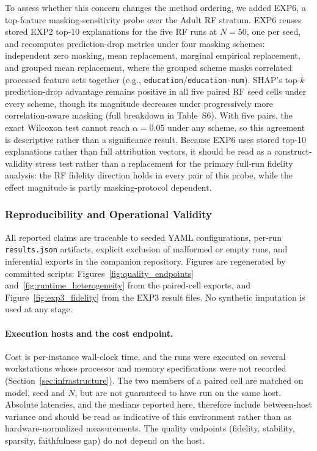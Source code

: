 \documentclass[10pt,a4paper,twoside]{article}
\begin{document}
To assess whether this concern changes the method ordering, we added EXP6,
a top-feature masking-sensitivity probe over the Adult RF stratum. EXP6
reuses stored EXP2 top-10 explanations for the five RF runs at $N=50$,
one per seed, and recomputes prediction-drop metrics under four masking schemes:
independent zero masking, mean replacement, marginal empirical replacement,
and grouped mean replacement, where the grouped scheme masks correlated
processed feature sets together (e.g.,
\texttt{education}/\texttt{education-num}). SHAP's top-$k$ prediction-drop
advantage remains positive in all five paired RF seed cells under every
scheme, though its magnitude decreases under progressively more
correlation-aware masking (full breakdown in Table~S6). With five pairs, the exact Wilcoxon test cannot reach
$\alpha = 0.05$ under any scheme, so this agreement is descriptive rather
than a significance result. Because EXP6 uses stored top-10 explanations rather than full
attribution vectors, it should be read as a construct-validity stress test
rather than a replacement for the primary full-run fidelity analysis: the
RF fidelity direction holds in every pair of this probe, while the effect magnitude
is partly masking-protocol dependent.

\subsubsection{Reproducibility and Operational Validity}

All reported claims are traceable to seeded YAML configurations, per-run
\texttt{results.json} artifacts, explicit exclusion of malformed or empty
runs, and inferential exports in the companion repository. Figures are
regenerated by committed scripts: Figures~\ref{fig:quality_endpoints}
and~\ref{fig:runtime_heterogeneity} from the paired-cell exports, and
Figure~\ref{fig:exp3_fidelity} from the EXP3 result files. No synthetic
imputation is used at any stage.

\paragraph{Execution hosts and the cost endpoint.} Cost is per-instance
wall-clock time, and the runs were executed on several workstations whose
processor and memory specifications were not recorded
(Section~\ref{sec:infrastructure}). The two members of a paired cell are
matched on model, seed and $N$, but are not guaranteed to have run on the
same host. Absolute latencies, and the medians reported here, therefore
include between-host variance and should be read as indicative of this
environment rather than as hardware-normalized measurements. The quality
endpoints (fidelity, stability, sparsity, faithfulness gap) do not depend on
the host.
\end{document}
